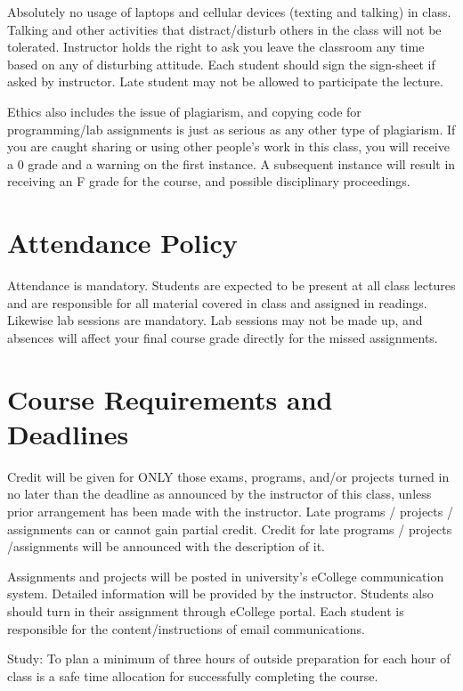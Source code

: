 \documentclass[11pt]{article}
\begin{document}
Absolutely no usage of laptops and cellular devices (texting and
talking) in class. Talking and other activities that distract/disturb
others in the class will not be tolerated. Instructor holds the right
to ask you leave the classroom any time based on any of disturbing
attitude. Each student should sign the sign-sheet if asked by
instructor. Late student may not be allowed to participate the
lecture.

Ethics also includes the issue of plagiarism, and copying code for
programming/lab assignments is just as serious as any other type of
plagiarism.  If you are caught sharing or using other people's work in
this class, you will receive a 0 grade and a warning on the first
instance.  A subsequent instance will result in receiving an F grade
for the course, and possible disciplinary proceedings.

\section*{Attendance Policy}
\label{sec-9}

Attendance is mandatory. Students are expected to be present at all
class lectures and are responsible for all material covered in class
and assigned in readings.  Likewise lab sessions are mandatory.  Lab
sessions may not be made up, and absences will affect your final
course grade directly for the missed assignments.

\section*{Course Requirements and Deadlines}
\label{sec-10}
Credit will be given for ONLY those exams, programs, and/or projects
turned in no later than the deadline as announced by the instructor of
this class, unless prior arrangement has been made with the
instructor. Late programs / projects / assignments can or cannot gain
partial credit. Credit for late programs / projects /assignments will be
announced with the description of it.

Assignments and projects will be posted in university’s eCollege
communication system. Detailed information will be provided by the
instructor. Students also should turn in their assignment through
eCollege portal. Each student is responsible for the
content/instructions of email communications.

Study: To plan a minimum of three hours of outside preparation for
each hour of class is a safe time allocation for successfully
completing the course.
\end{document}
